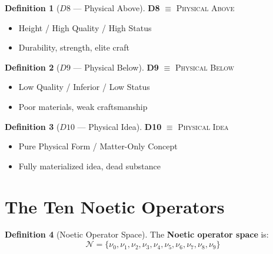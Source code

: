 \documentclass[11pt,twoside,openright]{book}
\theoremstyle{definition}
\newtheorem{definition}{Definition}[chapter]
\theoremstyle{plain}
\theoremstyle{remark}
\newcommand{\Noetics}{\mathcal{N}}
\newcommand{\noe}[1]{\nu_{#1}}
\begin{document}
\begin{definition}[$D8$ --- Physical Above]
\label{def:D8}
\textbf{D8} $\equiv$ \textsc{Physical Above}
\begin{itemize}
  \item Height / High Quality / High Status
  \item Durability, strength, elite craft
\end{itemize}
\end{definition}

\begin{definition}[$D9$ --- Physical Below]
\label{def:D9}
\textbf{D9} $\equiv$ \textsc{Physical Below}
\begin{itemize}
  \item Low Quality / Inferior / Low Status
  \item Poor materials, weak craftsmanship
\end{itemize}
\end{definition}

\begin{definition}[$D10$ --- Physical Idea]
\label{def:D10}
\textbf{D10} $\equiv$ \textsc{Physical Idea}
\begin{itemize}
  \item Pure Physical Form / Matter-Only Concept
  \item Fully materialized idea, dead substance
\end{itemize}
\end{definition}

\section{The Ten Noetic Operators}

\begin{definition}[Noetic Operator Space]
\label{def:noetic-space}
The \textbf{Noetic operator space} is:
\[
\Noetics = \{\noe{0}, \noe{1}, \noe{2}, \noe{3}, \noe{4}, \noe{5}, \noe{6}, \noe{7}, \noe{8}, \noe{9}\}
\]
\end{definition}
\end{document}
